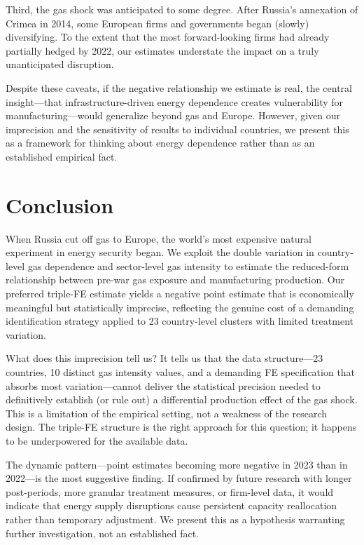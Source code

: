 \documentclass[12pt]{article}
\begin{document}
Third, the gas shock was anticipated to some degree. After Russia's annexation of Crimea in 2014, some European firms and governments began (slowly) diversifying. To the extent that the most forward-looking firms had already partially hedged by 2022, our estimates understate the impact on a truly unanticipated disruption.

Despite these caveats, if the negative relationship we estimate is real, the central insight---that infrastructure-driven energy dependence creates vulnerability for manufacturing---would generalize beyond gas and Europe. However, given our imprecision and the sensitivity of results to individual countries, we present this as a framework for thinking about energy dependence rather than as an established empirical fact.


\section{Conclusion}

When Russia cut off gas to Europe, the world's most expensive natural experiment in energy security began. We exploit the double variation in country-level gas dependence and sector-level gas intensity to estimate the reduced-form relationship between pre-war gas exposure and manufacturing production. Our preferred triple-FE estimate yields a negative point estimate that is economically meaningful but statistically imprecise, reflecting the genuine cost of a demanding identification strategy applied to 23 country-level clusters with limited treatment variation.

What does this imprecision tell us? It tells us that the data structure---23 countries, 10 distinct gas intensity values, and a demanding FE specification that absorbs most variation---cannot deliver the statistical precision needed to definitively establish (or rule out) a differential production effect of the gas shock. This is a limitation of the empirical setting, not a weakness of the research design. The triple-FE structure is the right approach for this question; it happens to be underpowered for the available data.

The dynamic pattern---point estimates becoming more negative in 2023 than in 2022---is the most suggestive finding. If confirmed by future research with longer post-periods, more granular treatment measures, or firm-level data, it would indicate that energy supply disruptions cause persistent capacity reallocation rather than temporary adjustment. We present this as a hypothesis warranting further investigation, not an established fact.
\end{document}

